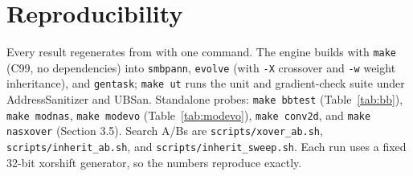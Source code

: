 \documentclass[11pt]{article}
\begin{document}
\section*{Reproducibility}

Every result regenerates from \cite{repo} with one command. The engine builds with
\texttt{make} (C99, no dependencies) into \texttt{smbpann}, \texttt{evolve} (with
\texttt{-X} crossover and \texttt{-w} weight inheritance), and \texttt{gentask};
\texttt{make ut} runs the unit and gradient-check suite under AddressSanitizer and UBSan.
Standalone probes: \texttt{make bbtest} (Table~\ref{tab:bb}), \texttt{make modnas},
\texttt{make modevo} (Table~\ref{tab:modevo}), \texttt{make conv2d}, and
\texttt{make nasxover} (Section 3.5). Search A/Bs are \texttt{scripts/xover\_ab.sh},
\texttt{scripts/inherit\_ab.sh}, and \texttt{scripts/inherit\_sweep.sh}. Each run uses a
fixed 32-bit xorshift generator, so the numbers reproduce exactly.
\end{document}
